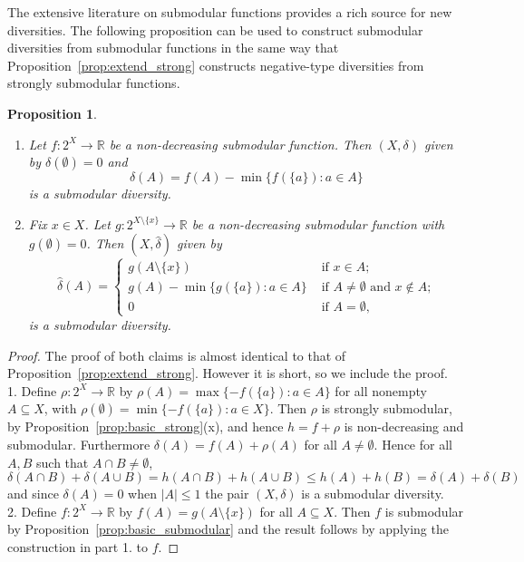 \documentclass{article}
\theoremstyle{plain}
\newtheorem{proposition}[theorem]{Proposition}
\theoremstyle{definition}
\newcommand{\whd}{\widehat{\delta}}
\renewcommand{\Re}{\mathbb{R}}
\begin{document}
The extensive literature on submodular functions provides a rich source for new diversities. The following proposition can be used to construct submodular diversities from submodular functions in the same way that Proposition~\ref{prop:extend_strong} constructs negative-type diversities from strongly submodular functions. 

\begin{proposition} \label{prop:extend_sub}
\begin{enumerate}
\item Let $f:2^X \rightarrow \Re$ be a non-decreasing submodular function. Then $(X,\delta)$ given by $\delta(\emptyset) = 0$ and 
\[\delta(A) = f(A) - \min\{f(\{a\}): a \in A \}\]
is a submodular diversity.
\item Fix $x \in X$. Let $g:2^{X \setminus \{x\}} \rightarrow \Re$ be a non-decreasing submodular function with $g(\emptyset) = 0$. Then $(X,\whd)$ given by 
\[
\whd(A) = \begin{cases} g(A \setminus \{x\}) & \mbox{ if $x \in A$;} \\
g(A) - \min\{g(\{a\}):a \in A\} & \mbox{ if $A \neq \emptyset$ and $x \not \in A$;} \\
0 & \mbox{ if $A = \emptyset$,} \end{cases}
\]
is a submodular diversity.
\end{enumerate}
\end{proposition}
\begin{proof}
The proof of both claims is almost identical to that of Proposition~\ref{prop:extend_strong}.  However it is short, so we include the proof. \\
1.  Define $\rho:2^X \rightarrow \Re$ by $\rho(A) = \max\{-f(\{a\}): a \in A\}$ for all nonempty $A \subseteq X$, with $\rho(\emptyset) = \min\{-f(\{a\}):a \in  X\}$. Then $\rho$ is strongly submodular, by Proposition~\ref{prop:basic_strong}(x), and hence $h = f + \rho$ is non-decreasing and submodular. Furthermore $\delta(A) = f(A) + \rho(A)$ for all $A \neq \emptyset$. Hence for all $A,B$ such that $A \cap B \neq \emptyset$, 
\[\delta(A \cap B) + \delta(A \cup B) = h(A \cap B) + h(A \cup B) \leq h(A) + h(B) = \delta(A) + \delta(B)\]
and since $\delta(A) = 0$ when $|A| \leq 1$ the pair $(X,\delta)$ is a submodular diversity.\\
2. Define $f:2^X \rightarrow \Re$ by $f(A) = g(A \setminus \{x\})$ for all $A \subseteq X$. Then $f$ is submodular by Proposition~\ref{prop:basic_submodular} and the result follows by applying the construction in part 1. to $f$.
\end{proof}
\end{document}
